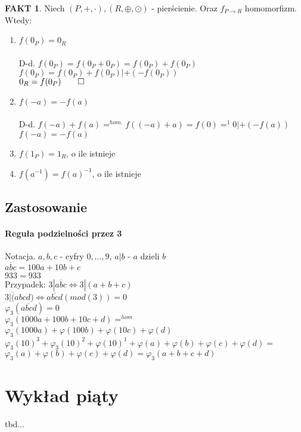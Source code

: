 \documentclass{article}
\theoremstyle{definition}
\theoremstyle{definition}
\theoremstyle{definition}
\theoremstyle{definition}
\newtheorem*{fakt}{FAKT}
\begin{document}
\begin{fakt}
Niech $(P,+,\cdot), (R, \oplus, \odot)$ - pierścienie. Oraz $f_{P\rightarrow R}$ homomorfizm. Wtedy:
\begin{enumerate}
\item $f(0_P)=0_R$\\\\
D-d. $f(0_P)=f(0_P+0_P)=f(0_P)+f(0_P)$\\
$f(0_P)=f(0_P)+f(0_P) | +(-f(0_P))$\\
$0_R=f(0_P)\qed$
\item $f(-a)=-f(a)$\\\\
D-d. $f(-a)+f(a)=^{hom.} f((-a)+a)=f(0)=^{1}0 | + (-f(a))$\\
$f(-a)=-f(a)$
\item $f(1_P)=1_R$, o ile istnieje
\item $f(a^{-1})=f(a)^{-1}$, o ile istnieje
\end{enumerate}
\end{fakt}

\subsection{Zastosowanie}

\paragraph{Reguła podzielności przez 3}
Notacja. $a,b,c$ - cyfry $0,\dots, 9$, $a|b$ - $a$ dzieli $b$ \\ 
$\overline{abc}=100a + 10b + c$\\
$\overline{933}=933$\\
Przypadek: $3|\overline{abc} \iff 3| (a+b+c)$\\
$3|\overline(abcd) \iff \overline{abcd} (mod (3)) = 0$\\
$\varphi_3(\overline{abcd})=0$\\
$\varphi_3(1000a+100b+10c+d)=^{hom}$\\
$\varphi_3(1000a)+\varphi(100b)+\varphi(10c)+\varphi(d)$\\
$\varphi_3(10)^3+\varphi_3(10)^2+\varphi(10)^1+\varphi(a)+\varphi(b)+\varphi(c)+\varphi(d)=$\\
$\varphi_3(a)+\varphi(b)+\varphi(c)+\varphi(d)=\varphi_3(a+b+c+d)$

\section{Wykład piąty}
tbd... 
\end{document}
